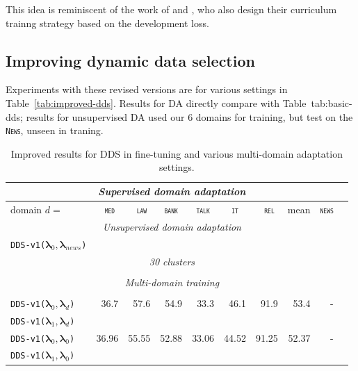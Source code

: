 \documentclass[11pt,a4paper]{article}
\newcommand{\fyTodo}[1]{\Todo[FY:]{\textcolor{orange}{#1}}}
\newcommand{\domain}[1]{\texttt{\textsc{#1}}}
\newcommand{\system}[1]{\texttt{{#1}}}
\newcommand{\vlambda}{\ensuremath{\boldsymbol\lambda}\xspace} %
\begin{document}
This idea is reminiscent of the work of \citet{alex17automated} and  \citet{Kumar19reinforcement}, who also design their curriculum trainng strategy based on the development loss.

\subsection{Improving dynamic data selection}
Experiments with these revised versions are for various settings in Table~\ref{tab:improved-dds}. Results for DA directly compare with Table~{tab:basic-dds}; results for unsupervised DA used our 6 domains for training, but test on the \domain{News}, unseen in traning.
\begin{table}
  \centering \small
  \begin{tabular}{|l|*9{r|}} \hline
    \multicolumn{9}{|c|}{\sl Supervised domain adaptation} \\ \hline
    domain \hfill $d=$ & \multicolumn{1}{c|}{\domain{ med}} & \multicolumn{1}{c|}{\domain{ law}} & \multicolumn{1}{c|}{\domain{bank}} & \multicolumn{1}{c|}{\domain{talk}} & \multicolumn{1}{c|}{\domain{ it }} & \multicolumn{1}{c|}{\domain{ rel}} & \multicolumn{1}{c|}{mean} & \multicolumn{1}{|c|}{\domain{news}} \\ \hline \hline
    \multicolumn{9}{|c|}{\sl Unsupervised domain adaptation} \\ \hline
    \system{DDS-v1($\vlambda_0, \vlambda_{news}$)} & \\  \hline\hline 
    \multicolumn{9}{|c|}{\sl 30 clusters} \\ \hline
    \\  \hline\hline 
    \multicolumn{9}{|c|}{\sl Multi-domain training} \\ \hline
    \\
    \system{DDS-v1($\vlambda_0, \vlambda_d$)} &36.7&57.6&54.9&33.3&46.1&91.9&53.4&- \\
    \system{DDS-v1($\vlambda_1, \vlambda_d$)} & \\
    \system{DDS-v1($\vlambda_0, \vlambda_0$)} &36.96&55.55&52.88&33.06&44.52&91.25&52.37&- \\
    \system{DDS-v1($\vlambda_1, \vlambda_0$)} & \\ \hline
  \end{tabular}
  \caption{Improved results for DDS in fine-tuning and various multi-domain adaptation settings.}
  \label{tab:basic-dds}
\end{table}

\fyTodo{Refaire table 3 + (unsupervised domain in source= classification) + new domain}
\end{document}

